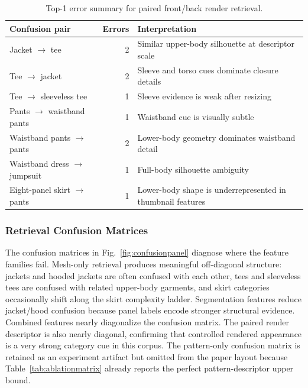 \documentclass[pdflatex,sn-mathphys-num]{sn-jnl}
\begin{document}
\begin{table}[!htbp]
\caption{Top-1 error summary for paired front/back render retrieval.}
\label{tab:rendererrorsummary}
\centering
\begin{tabular}{p{}rp{}}
\toprule
Confusion pair & Errors & Interpretation \\
\midrule
Jacket $\rightarrow$ tee & 2 & Similar upper-body silhouette at descriptor scale \\
Tee $\rightarrow$ jacket & 2 & Sleeve and torso cues dominate closure details \\
Tee $\rightarrow$ sleeveless tee & 1 & Sleeve evidence is weak after resizing \\
Pants $\rightarrow$ waistband pants & 1 & Waistband cue is visually subtle \\
Waistband pants $\rightarrow$ pants & 2 & Lower-body geometry dominates waistband detail \\
Waistband dress $\rightarrow$ jumpsuit & 1 & Full-body silhouette ambiguity \\
Eight-panel skirt $\rightarrow$ pants & 1 & Lower-body shape is underrepresented in thumbnail features \\
\bottomrule
\end{tabular}
\end{table}

\subsubsection{Retrieval Confusion Matrices}\label{sec:confusion}

The confusion matrices in Fig.~\ref{fig:confusionpanel} diagnose where the feature families fail. Mesh-only retrieval produces meaningful off-diagonal structure: jackets and hooded jackets are often confused with each other, tees and sleeveless tees are confused with related upper-body garments, and skirt categories occasionally shift along the skirt complexity ladder. Segmentation features reduce jacket/hood confusion because panel labels encode stronger structural evidence. Combined features nearly diagonalize the confusion matrix. The paired render descriptor is also nearly diagonal, confirming that controlled rendered appearance is a very strong category cue in this corpus. The pattern-only confusion matrix is retained as an experiment artifact but omitted from the paper layout because Table~\ref{tab:ablationmatrix} already reports the perfect pattern-descriptor upper bound.
\end{document}
